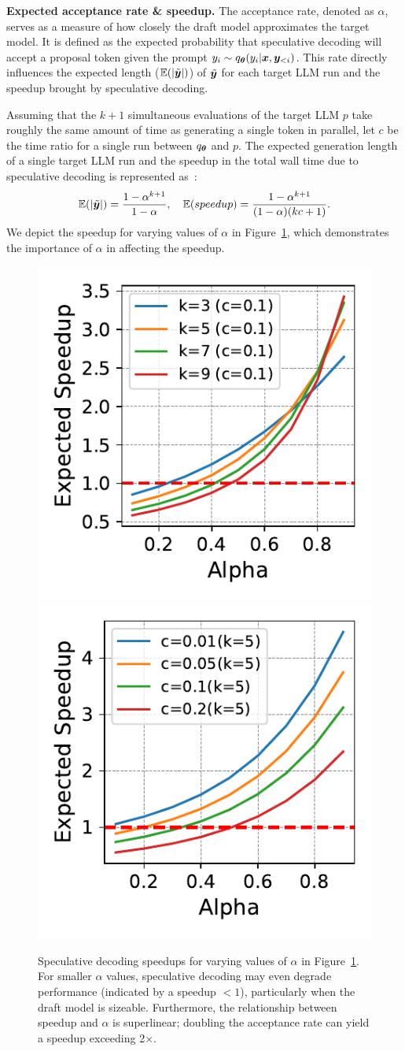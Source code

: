 \textbf{Expected acceptance rate \& speedup.} 
The acceptance rate, denoted as \(\alpha\), serves as a measure of how closely the draft model approximates the target model. It is defined as the expected probability that speculative decoding will accept a proposal token given the prompt \(y_i \sim q_{\bm{\theta}}(y_i|{\bm{x}}, {{\bm{y}}}_{<i})\). This rate directly influences the expected length ($\mathbb{E}(|\tilde{{\bm{y}}}|)$) of \(\tilde{{\bm{y}}}\) for each target LLM run and the speedup brought by speculative decoding. 

Assuming that the \(k + 1\) simultaneous evaluations of the target LLM \(p\) take roughly the same amount of time as generating a single token in parallel, %
let \(c\) be the time ratio for a single run between \(q_{\bm{\theta}}\) and \(p\). The expected generation length of a single target LLM run and the speedup in the total wall time due to speculative decoding is represented as~\citep{leviathan2023fast}:
\begin{equation}
\label{eq:gen_len}
    \mathbb{E}(|\tilde{{\bm{y}}}|) = \frac{1 - \alpha^{k+1}}{1-\alpha},\quad \mathbb{E}(speedup)=\frac{1-\alpha^{k+1}}{(1-\alpha)(kc+1)}.
\end{equation}
We depict the speedup for varying values of \(\alpha\) in Figure~\ref{fig:analysis-alphas}, which demonstrates the importance of $\alpha$ in affecting the speedup.

\begin{figure}[h]       
    \centering
    \label{fig:analysis-alphas}
    \includegraphics[width=0.25\linewidth]{figures/analysis_k.pdf}
    \includegraphics[width=0.25\linewidth]{figures/analysis_c.pdf}
    \caption{Speculative decoding speedups for varying values of \(\alpha\) in Figure~\ref{fig:analysis-alphas}. For smaller \(\alpha\) values, speculative decoding may even degrade performance (indicated by a speedup \(<1\)), particularly when the draft model is sizeable. Furthermore, the relationship between speedup and \(\alpha\) is superlinear; doubling the acceptance rate can yield a speedup exceeding 2$\times$.}
\end{figure}



